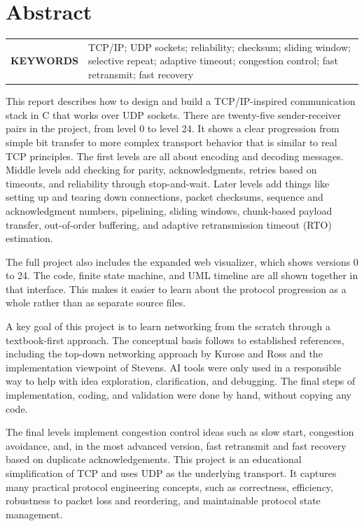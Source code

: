 \chapter{Abstract}
\begin{tabular}{@{} >{\bfseries}p{} p{} @{}}
\MakeUppercase{Keywords} &
TCP/IP; UDP sockets; reliability; checksum; sliding window; selective repeat;
adaptive timeout; congestion control; fast retransmit; fast recovery\\
\end{tabular}
\par

\begin{doublespacing}
This report describes how to design and build a TCP/IP-inspired communication
stack in C that works over UDP sockets. There are twenty-five sender-receiver
pairs in the project, from level 0 to level 24. It shows a clear progression
from simple bit transfer to more complex transport behavior that is similar to
real TCP principles. The first levels are all about encoding and decoding
messages. Middle levels add checking for parity, acknowledgments, retries based
on timeouts, and reliability through stop-and-wait. Later levels add things
like setting up and tearing down connections, packet checksums, sequence and
acknowledgment numbers, pipelining, sliding windows, chunk-based payload
transfer, out-of-order buffering, and adaptive retransmission timeout (RTO)
estimation.

The full project also includes the expanded web visualizer, which shows
versions 0 to 24. The code, finite state machine, and UML timeline are all
shown together in that interface. This makes it easier to learn about the
protocol progression as a whole rather than as separate source files.

A key goal of this project is to learn networking from the scratch through a
textbook-first approach. The conceptual basis follows to established
references, including the top-down networking approach by Kurose and Ross and
the implementation viewpoint of Stevens. AI tools were only used in a
responsible way to help with idea exploration, clarification, and debugging.
The final steps of implementation, coding, and validation were done by hand,
without copying any code.

\newpage

\begin{samepage}
The final levels implement congestion control ideas such as slow start,
congestion avoidance, and, in the most advanced version, fast retransmit and
fast recovery based on duplicate acknowledgements. This project is an
educational simplification of TCP and uses UDP as the underlying transport. It
captures many practical protocol engineering concepts, such as correctness,
efficiency, robustness to packet loss and reordering, and maintainable
protocol state management.
\end{samepage}


\end{doublespacing}
